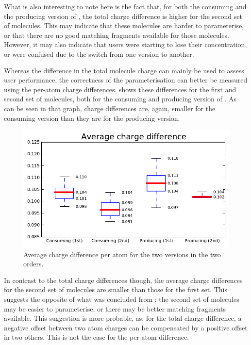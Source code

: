What is also interesting to note here is the fact that, for both the consuming and the producing version of \oframp, the total charge difference is higher for the second set of molecules. This may indicate that these molecules are harder to parameterise, or that there are no good matching fragments available for those molecules. However, it may also indicate that users were starting to lose their concentration, or were confused due to the switch from one version to another.

Whereas the difference in the total molecule charge can mainly be used to assess user performance, the correctness of the parameterisation can better be measured using the per-atom charge differences.  shows these differences for the first and second set of molecules, both for the consuming and producing version of \oframp. As can be seen in that graph, charge differences are, again, smaller for the consuming version than they are for the producing version.

\begin{figure}
\center
\includegraphics[width=.6\textwidth]{img/graphs/1a_01.pdf}
\caption{Average charge difference per atom for the two versions in the two orders.}
\end{figure}

In contrast to the total charge differences though, the average charge differences for the second set of molecules are smaller than those for the first set. This suggests the opposite of what was concluded from : the second set of molecules may be easier to parameterise, or there may be better matching fragments available. This suggestion is more probable, as, for the total charge difference, a negative offset between two atom charges can be compensated by a positive offset in two others. This is not the case for the per-atom difference.

